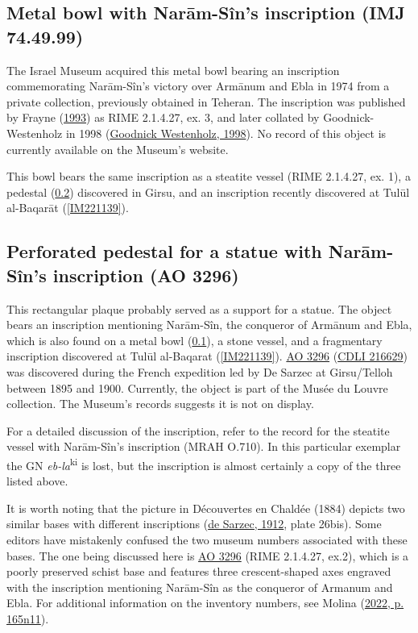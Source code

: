 \documentclass[
]{book}
\begin{document}
\hypertarget{IMJ744999}{%
\subsection{Metal bowl with Narām-Sîn's inscription (IMJ 74.49.99)}\label{IMJ744999}}

The Israel Museum acquired this metal bowl bearing an inscription commemorating Narām-Sîn's victory over Armānum and Ebla in 1974 from a private collection, previously obtained in Teheran. The inscription was published by Frayne (\protect\hyperlink{ref-Frayne1993}{1993}) as RIME 2.1.4.27, ex. 3, and later collated by Goodnick-Westenholz in 1998 (\protect\hyperlink{ref-GoodnickWestenholz1998}{Goodnick Westenholz, 1998}). No record of this object is currently available on the Museum's website.

This bowl bears the same inscription as a steatite vessel (RIME 2.1.4.27, ex. 1), a pedestal (\ref{AO3296}) discovered in Girsu, and an inscription recently discovered at Tulūl al-Baqarāt (\ref{IM221139}).

\hypertarget{AO3296}{%
\subsection{Perforated pedestal for a statue with Narām-Sîn's inscription (AO 3296)}\label{AO3296}}

This rectangular plaque probably served as a support for a statue. The object bears an inscription mentioning Narām-Sîn, the conqueror of Armānum and Ebla, which is also found on a metal bowl (\ref{IMJ744999}), a stone vessel, and a fragmentary inscription discovered at Tulūl al-Baqarat (\ref{IM221139}). \href{Perforated\%20pedestal\%20for\%20a\%20statue\%20with\%20Narām-Sîn\textquotesingle{}s\%20inscription\%20(AO\%203296)}{AO 3296} (\href{https://cdli.mpiwg-berlin.mpg.de/artifacts/216629}{CDLI 216629}) was discovered during the French expedition led by De Sarzec at Girsu/Telloh between 1895 and 1900. Currently, the object is part of the Musée du Louvre collection. The Museum's records suggests it is not on display.

For a detailed discussion of the inscription, refer to the record for the steatite vessel with Narām-Sîn's inscription (MRAH O.710). In this particular exemplar the GN \emph{eb-la}\textsuperscript{ki} is lost, but the inscription is almost certainly a copy of the three listed above.

It is worth noting that the picture in Découvertes en Chaldée (1884) depicts two similar bases with different inscriptions (\protect\hyperlink{ref-deSarzec1912}{de Sarzec, 1912}, plate 26bis). Some editors have mistakenly confused the two museum numbers associated with these bases. The one being discussed here is \href{https://collections.louvre.fr/en/ark:/53355/cl010121772}{AO 3296} (RIME 2.1.4.27, ex.2), which is a poorly preserved schist base and features three crescent-shaped axes engraved with the inscription mentioning Narām-Sîn as the conqueror of Armanum and Ebla. For additional information on the inventory numbers, see Molina (\protect\hyperlink{ref-Molina2022}{2022, p. 165n11}).
\end{document}
